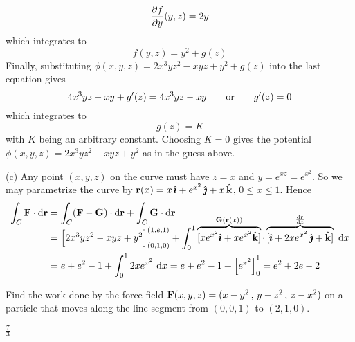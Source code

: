 \begin{solution}
\begin{equation*}
\pdiff{f}{y}(y,z) = 2y
\end{equation*}
which integrates to
\begin{equation*}
f(y,z) = y^2+ g(z)
\end{equation*}
Finally, substituting $\phi(x,y,z) = 2x^3yz^2-xyz + y^2 + g(z)$
into the last equation gives
\begin{equation*}
4x^3yz-xy + g'(z) = 4x^3yz-xy\qquad\hbox{or}\qquad 
g'(z) = 0
\end{equation*}
which integrates to
\begin{equation*}
g(z) =  K
\end{equation*}
with $K$ being an arbitrary constant.
Choosing $K=0$ gives the potential $\phi(x,y,z) =  2x^3yz^2-xyz + y^2$
as in the guess above.


(c) Any point $(x,y,z)$ on the curve must have $z=x$ and $y=e^{xz}=e^{x^2}$.
So we may parametrize the curve by
$\mathbf{r}(x)=x\,\hat{\pmb{\imath}}+e^{x^2}\,\hat{\pmb{\jmath}}+x\,\hat{\mathbf{k}}$, $0\le x\le 1$. Hence
\begin{align*}
\int_C\vF\cdot \dee{\vr}
&=\int_C(\vF-\vG)\cdot \dee{\vr}+\int_C\vG\cdot \dee{\vr}\\[-0.2in]
&=\Big[2x^3yz^2-xyz+y^2\Big]_{(0,1,0)}^{(1,e,1)}
+\int_0^1\overbrace{[xe^{x^2}\hi + xe^{x^2}\hk]}^{\vG(\vr(x))}\cdot 
   \overbrace{[\hi+2xe^{x^2}\,\hj+\hk]}^{\diff{\vr}{x}}\ \dee{x}\\
&=e+e^2-1+\int_0^1 2xe^{x^2}\ \dee{x}
=e+e^2-1+\Big[e^{x^2}\Big]_0^1
=e^2+2e-2
\end{align*}
\end{solution}

\begin{question}[M317 2016D] %
Find the work done by the force field 
$\mathbf{F}(x,y,z) = (x - y^2\,,\, y - z^2\,,\, z - x^2)$ on a particle 
that moves along the line segment from $(0, 0, 1)$ to $(2, 1, 0)$.
\end{question}

%

\begin{answer} 
$\frac{7}{3}$
\end{answer}

